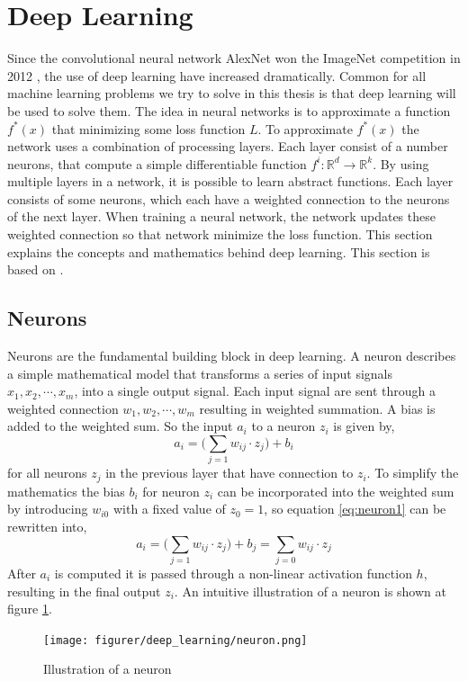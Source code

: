 \documentclass[11pt]{article}
\begin{document}
\section{Deep Learning}\label{sec:deep_learning}

Since the convolutional neural network AlexNet won the ImageNet competition in 2012 \cite{Krizhevsky:2012:ICD:2999134.2999257}, the use of deep learning have increased dramatically. Common for all machine learning problems we try to solve in this thesis is that deep learning will be used to solve them. The idea in neural networks is to approximate a function $f^{\ast}(x)$ that minimizing some loss function $L$. To approximate $f^{\ast}(x)$ the network uses a combination of processing layers. Each layer consist of a number neurons, that compute a simple differentiable function $f^{i} : \mathbb{R}^{d} \rightarrow \mathbb{R}^{k}$. By using multiple layers in a network, it is possible to learn abstract functions. Each layer consists of some neurons, which each have a weighted connection to the neurons of the next layer. When training a neural network, the network updates these weighted connection so that network minimize the loss function. This section explains the concepts and mathematics behind deep learning. This section is based on \cite{Goodfellow-et-al-2016}.


\subsection{Neurons}

Neurons are the fundamental building block in deep learning. A neuron describes a simple mathematical model that transforms a series of input signals $x_{1}, x_{2}, \cdots, x_{m}$, into a single output signal. Each input signal are sent through a weighted connection $w_{1}, w_{2}, \cdots , w_{m}$ resulting in weighted summation. A bias is added to the weighted sum. So the input $a_{i}$ to a neuron $z_{i}$ is given by,
\begin{equation}\label{eq:neuron1}
    a_{i} = \Big(\sum_{j = 1} w_{ij} \cdot z_{j}\Big) + b_{i}
\end{equation}
for all neurons $z_{j}$ in the previous layer that have connection to $z_{i}$. To simplify the mathematics the bias $b_{i}$ for neuron $z_{i}$ can be incorporated into the weighted sum by introducing $w_{i0}$ with a fixed value of $z_{0} = 1$, so equation \ref{eq:neuron1} can be rewritten into,
\begin{equation}
     a_{i} = \Big(\sum_{j = 1} w_{ij} \cdot z_{j}\Big) + b_{j} = \sum_{j = 0} w_{ij} \cdot z_{j}
\end{equation}
After $a_{i}$ is computed it is passed through a non-linear activation function $h$, resulting in the final output $z_{i}$. An intuitive illustration of a neuron is shown at figure \ref{fig:neuron}.
\begin{figure}[!h]
    \centering
    \texttt{[image: figurer/deep\_learning/neuron.png]}
    \caption{Illustration of a neuron}
    \label{fig:neuron}
\end{figure}
\end{document}
